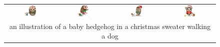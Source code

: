 \begin{figure}[ht!]
\begin{tabular}{cccc}
        \includegraphics[width=0.24\textwidth]{figures/cross/hedgehog_0.jpg} &
        \includegraphics[width=0.24\textwidth]{figures/cross/hedgehog_1.jpg} &
        \includegraphics[width=0.24\textwidth]{figures/cross/hedgehog_2.jpg} &
        \includegraphics[width=0.24\textwidth]{figures/cross/hedgehog_3.jpg} \vspace{-1mm}\\
        \multicolumn{4}{c}{\small an illustration of a baby hedgehog in a christmas sweater walking a dog}\\


\end{tabular}
\end{figure}
